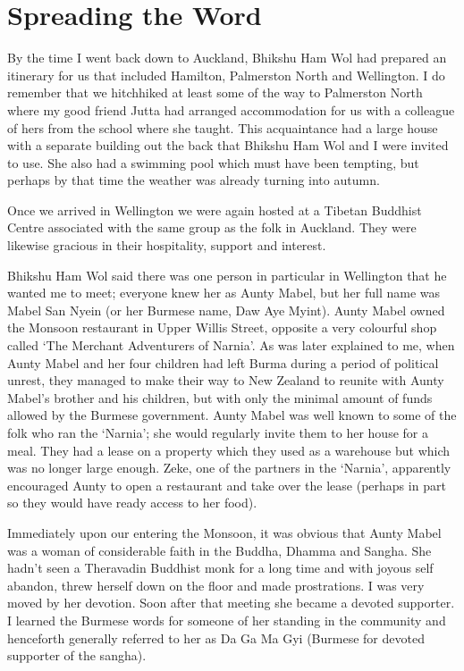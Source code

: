 \chapter{Spreading the Word}

By the time I went back down to Auckland, Bhikshu Ham Wol had prepared
an itinerary for us that included Hamilton, Palmerston North and
Wellington. I do remember that we hitchhiked at least some of the way to
Palmerston North where my good friend Jutta had arranged accommodation
for us with a colleague of hers from the school where she taught. This
acquaintance had a large house with a separate building out the
back that Bhikshu Ham Wol and I were invited to use. She also had a
swimming pool which must have been tempting, but perhaps by that time
the weather was already turning into autumn.

Once we arrived in Wellington we were again hosted at a Tibetan Buddhist
Centre associated with the same group as the folk in Auckland. They were
likewise gracious in their hospitality, support and interest.

Bhikshu Ham Wol said there was one person in particular in Wellington
that he wanted me to meet; everyone knew her as Aunty Mabel, but her
full name was Mabel San Nyein (or her Burmese name, Daw Aye Myint).
Aunty Mabel owned the Monsoon restaurant in Upper Willis Street,
opposite a very colourful shop called `The Merchant Adventurers of Narnia'.
As was later explained to me, when Aunty Mabel and her four children had
left Burma during a period of political unrest, they managed to make
their way to New Zealand to reunite with Aunty Mabel's brother and his
children, but with only the minimal amount of funds allowed by the
Burmese government. Aunty Mabel was well known to some of the folk who
ran the `Narnia'; she would regularly invite them to her house for a
meal. They had a lease on a property which they used as a warehouse but
which was no longer large enough. Zeke, one of the partners in the
`Narnia', apparently encouraged Aunty to open a restaurant and take over
the lease (perhaps in part so they would have ready access to her food).

Immediately upon our entering the Monsoon, it was obvious that Aunty
Mabel was a woman of considerable faith in the Buddha, Dhamma and
Sangha. She hadn't seen a Theravadin Buddhist monk for a long time and
with joyous self abandon, threw herself down on the floor and made
prostrations. I was very moved by her devotion. Soon after that meeting
she became a devoted supporter. I learned the Burmese words for
someone of her standing in the community and henceforth generally referred to her
as Da Ga Ma Gyi (Burmese for devoted supporter of the sangha).

